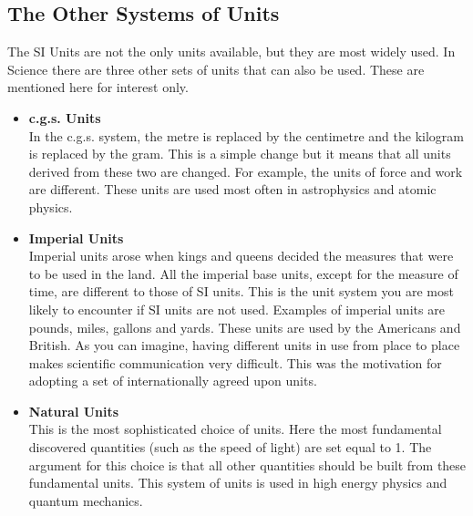  \subsection*{The Other Systems of Units}
            \nopagebreak
The SI Units are not the only units available, but they are most widely used. In Science there are three other sets of units that can also be used. These are mentioned here for interest only.
\begin{itemize}
 \item \textbf{c.g.s. Units} \\
In the c.g.s. system, the metre is replaced by the centimetre and the kilogram is replaced by the gram. This is a simple change but it means that all units derived from these two are changed. For example, the units of force and work are different. These units are used most often in astrophysics and atomic physics.
\item \textbf{Imperial Units} \\
Imperial units arose when kings and queens decided the measures that were to be used in the land. All the imperial base units, except for the measure of time, are different to those of SI units. This is the unit system you are most likely to encounter if SI units are not used. Examples of imperial units are pounds, miles, gallons and yards. These units are used by the Americans and British. As you can imagine, having different units in use from place to place makes scientific communication very difficult. This was the motivation for adopting a set of internationally agreed upon units.
\item \textbf{Natural Units} \\
This is the most sophisticated choice of units. Here the most fundamental discovered quantities (such as the speed of light) are set equal to 1. The argument for this choice is that all other quantities should be built from these fundamental units. This system of units is used in high energy physics and quantum mechanics.
\end{itemize}
